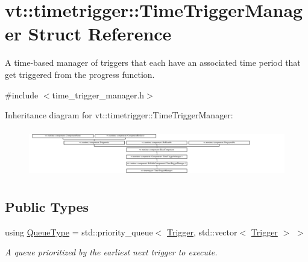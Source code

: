 \hypertarget{structvt_1_1timetrigger_1_1_time_trigger_manager}{}\section{vt\+:\+:timetrigger\+:\+:Time\+Trigger\+Manager Struct Reference}
\label{structvt_1_1timetrigger_1_1_time_trigger_manager}


A time-\/based manager of triggers that each have an associated time period that get triggered from the progress function.  




{\ttfamily \#include $<$time\+\_\+trigger\+\_\+manager.\+h$>$}

Inheritance diagram for vt\+:\+:timetrigger\+:\+:Time\+Trigger\+Manager\+:\begin{figure}[H]
\begin{center}
\leavevmode
\includegraphics[height=2.100000cm]{structvt_1_1timetrigger_1_1_time_trigger_manager}
\end{center}
\end{figure}
\subsection*{Public Types}
\begin{DoxyCompactItemize}
\item 
using \hyperlink{structvt_1_1timetrigger_1_1_time_trigger_manager_ad5dc7eeeb4b0d12a5582544d8f0a08c8}{Queue\+Type} = std\+::priority\+\_\+queue$<$ \hyperlink{structvt_1_1timetrigger_1_1_trigger}{Trigger}, std\+::vector$<$ \hyperlink{structvt_1_1timetrigger_1_1_trigger}{Trigger} $>$ $>$
\begin{DoxyCompactList}\small\item\em A queue prioritized by the earliest next trigger to execute. \end{DoxyCompactList}\end{DoxyCompactItemize}
